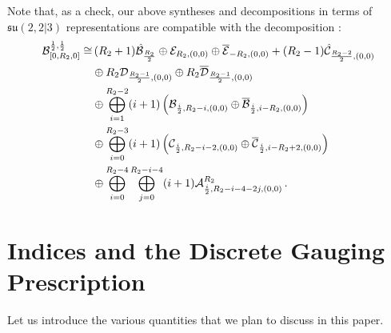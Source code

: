 \documentclass[main.tex]{subfiles}
\begin{document}
Note that, as a check, our above syntheses and decompositions in terms of $\mathfrak{su}(2,2|3)$ representations are compatible with the decomposition \cite{DolanOsborn}:
\begin{equation}
\begin{aligned}
\mathcal{B}_{[0,R_2,0]}^{\frac{1}{2},\frac{1}{2}}\color{black}\cong&\,(R_2+1)\hat{\mathcal{B}}_{\frac{R_2}{2}}\oplus\mathcal{E}_{R_2,(0,0)}\oplus\overline{\mathcal{E}}_{-R_2,(0,0)}+(R_2-1)\hat{\mathcal{C}}_{\frac{R_2-2}{2},(0,0)}\\
&\oplus R_2\mathcal{D}_{\frac{R_2-1}{2},(0,0)}\oplus R_2\overline{\mathcal{D}}_{\frac{R_2-1}{2},(0,0)}\\
&\oplus\bigoplus_{i=1}^{R_2-2}(i+1)\left(\mathcal{B}_{\frac{i}{2},R_2-i,(0,0)}\oplus\overline{\mathcal{B}}_{\frac{i}{2},i-R_2,(0,0)}\right)\\
&\oplus\bigoplus_{i=0}^{R_2-3}(i+1)\left(\mathcal{C}_{\frac{i}{2},R_2-i-2,(0,0)}\oplus\overline{\mathcal{C}}_{\frac{i}{2},i-R_2+2,(0,0)}\right)\\
&\oplus\bigoplus_{i=0}^{R_2-4}\bigoplus_{j=0}^{R_2-i-4}(i+1)\mathcal{A}^{R_2}_{\frac{i}{2},R_2-i-4-2j,(0,0)}\,.
\end{aligned}
\end{equation}

\section{Indices and the Discrete Gauging Prescription}\label{sec:Index}\renewcommand{\arraystretch}{1.1}
Let us introduce the various quantities that we plan to discuss in this paper. 
\end{document}
